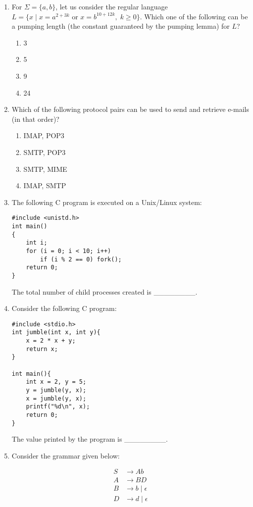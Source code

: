 \documentclass[12pt]{article}
\begin{document}
\begin{enumerate}[label=Q.\arabic*]
\item For $\Sigma = \{a, b\}$, let us consider the regular language $L = \{x \mid x = a^{2+3k} \text{ or } x = b^{10+12k},\; k \geq 0\}$. Which one of the following can be a pumping length (the constant guaranteed by the pumping lemma) for $L$?
\begin{multicols}{2}
\begin{enumerate}[label=(\Alph*)]
\item 3
\item 5
\item 9
\item 24
\end{enumerate}
\end{multicols}

\item Which of the following protocol pairs can be used to send and retrieve e-mails (in that order)?
\begin{multicols}{2}
\begin{enumerate}[label=(\Alph*)]
\item IMAP, POP3
\item SMTP, POP3
\item SMTP, MIME
\item IMAP, SMTP
\end{enumerate}
\end{multicols}

\item The following C program is executed on a Unix/Linux system:
\begin{verbatim}
#include <unistd.h>
int main()
{
    int i;
    for (i = 0; i < 10; i++)
        if (i % 2 == 0) fork();
    return 0;
}
\end{verbatim}

The total number of child processes created is \_\_\_\_\_\_\_\_.

\item Consider the following C program:
\begin{verbatim}
#include <stdio.h>
int jumble(int x, int y){
    x = 2 * x + y;
    return x;
}

int main(){
    int x = 2, y = 5;
    y = jumble(y, x);
    x = jumble(y, x);
    printf("%d\n", x);
    return 0;
}
\end{verbatim}

The value printed by the program is \_\_\_\_\_\_\_\_.

\item Consider the grammar given below:

\[
\begin{aligned}
S &\rightarrow Ab \\
A &\rightarrow BD \\
B &\rightarrow b \mid \epsilon \\
D &\rightarrow d \mid \epsilon
\end{aligned}
\]


\end{enumerate}
\end{document}
